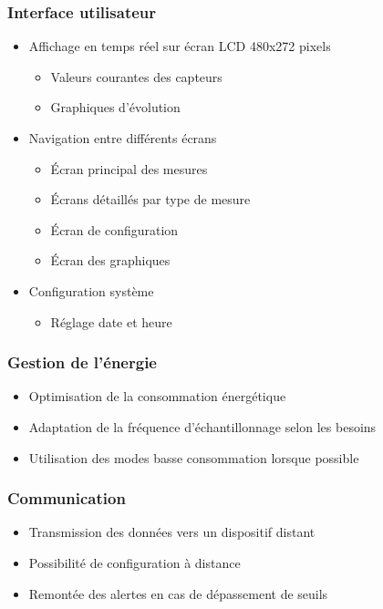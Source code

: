 \documentclass[12pt]{article}
\begin{document}
\subsubsection{Interface utilisateur}
\begin{itemize}
    \item Affichage en temps réel sur écran LCD 480x272 pixels
    \begin{itemize}
        \item Valeurs courantes des capteurs
        \item Graphiques d'évolution
    \end{itemize}
    \item Navigation entre différents écrans
    \begin{itemize}
        \item Écran principal des mesures
        \item Écrans détaillés par type de mesure
        \item Écran de configuration
        \item Écran des graphiques
    \end{itemize}
    \item Configuration système
    \begin{itemize}
        \item Réglage date et heure
    \end{itemize}
\end{itemize}

\subsubsection{Gestion de l'énergie}
\begin{itemize}
    \item Optimisation de la consommation énergétique
    \item Adaptation de la fréquence d'échantillonnage selon les besoins
    \item Utilisation des modes basse consommation lorsque possible
\end{itemize}

\subsubsection{Communication}
\begin{itemize}
    \item Transmission des données vers un dispositif distant
    \item Possibilité de configuration à distance
    \item Remontée des alertes en cas de dépassement de seuils
\end{itemize}
\end{document}

